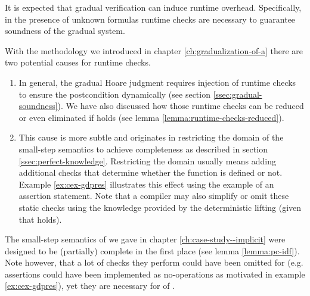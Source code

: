 It is expected that gradual verification can induce runtime overhead.
Specifically, in the presence of unknown formulas runtime checks are necessary to guarantee soundness of the gradual system.

With the methodology we introduced in chapter \ref{ch:gradualization-of-a} there are two potential causes for runtime checks.
\begin{enumerate}
    \item 
    In general, the gradual Hoare judgment requires injection of runtime checks to ensure the postcondition dynamically (see section \ref{ssec:gradual-soundness}).
    We have also discussed how those runtime checks can be reduced or even eliminated if  holds (see lemma \ref{lemma:runtime-checks-reduced}).
    \item 
    This cause is more subtle and originates in restricting the domain of the small-step semantics to achieve completeness as described in section \ref{ssec:perfect-knowledge}.
    Restricting the domain usually means adding additional checks that determine whether the function is defined or not.
    Example \ref{ex:cex-gdpres} illustrates this effect using the example of an assertion statement.
    Note that a compiler may also simplify or omit these static checks using the knowledge provided by the deterministic lifting (given that   holds).
\end{enumerate}

The small-step semantics of \svlidf we gave in chapter \ref{ch:case-study--implicit} were designed to be (partially) complete in the first place (see lemma \ref{lemma:pc-idf}).
Note however, that a lot of checks they perform could have been omitted for \svlidf (e.g. assertions could have been implemented as no-operations as motivated in example \ref{ex:cex-gdpres}), yet they are necessary for  of \gvlidf.

